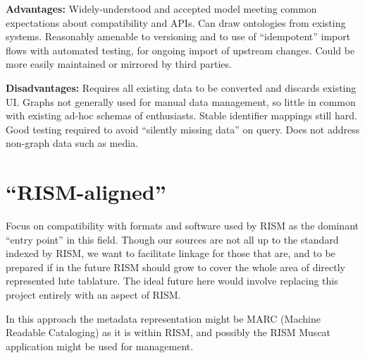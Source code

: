 \documentclass[a0,landscape]{a0poster}
\begin{document}
\begin{multicols}{3}
\begin{sloppypar}
  \noindent\textbf{Advantages:} Widely-understood and accepted model
  meeting common expectations about compatibility and APIs. Can draw
  ontologies from existing systems. Reasonably amenable to versioning
  and to use of ``idempotent'' import flows with automated testing,
  for ongoing import of upstream changes. Could be more easily
  maintained or mirrored by third parties.

  \noindent\textbf{Disadvantages:} Requires all existing data to be
  converted and discards existing UI. Graphs not generally used for
  manual data management, so little in common with existing ad-hoc
  schemas of enthusiasts. Stable identifier mappings still hard. Good
  testing required to avoid ``silently missing data'' on query. Does
  not address non-graph data such as media.
  
  \section{``RISM-aligned''}

  Focus on compatibility with formats and software used by RISM as the
  dominant ``entry point'' in this field. Though our sources are not
  all up to the standard indexed by RISM, we want to facilitate
  linkage for those that are, and to be prepared if in the future RISM
  should grow to cover the whole area of directly represented lute
  tablature. The ideal future here would involve replacing this
  project entirely with an aspect of RISM.

  \noindent In this approach the metadata representation might be MARC
  (Machine Readable Cataloging) as it is within RISM, and possibly the
  RISM Muscat application might be used for management.
  
\end{sloppypar}
  
\end{multicols}
\end{document}
